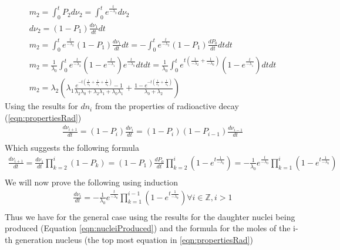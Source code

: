 \documentclass[12pt]{article}
\begin{document}
\begin{equation}\label{eqn:m2derivation}
\begin{split}
m_2 = \int_0^t P_2d\nu_{2} = \int_0^t e^{\frac{t}{-\lambda_2}}d\nu_2\\
d\nu_{2} = (1-P_{1})\frac{d\nu_{1}}{dt}dt\\
m_2 = \int_0^t e^{\frac{t}{-\lambda_2}}(1-P_{1})\frac{d\nu_{1}}{dt}dt = -\int_0^t e^{\frac{t}{-\lambda_2}}(1-P_{1})\frac{dP_0}{dt}dtdt\\
m_2 = \frac{1}{\lambda_0}\int_0^t e^{\frac{t}{-\lambda_2}}(1-e^{\frac{t}{-\lambda_1}})e^{\frac{t}{-\lambda_0}}dtdt = 
\frac{1}{\lambda_0}\int_0^t e^{t(\frac{1}{-\lambda_2}+\frac{1}{-\lambda_0})}(1-e^{\frac{t}{-\lambda_1}})dtdt\\
m_2 = \lambda_2(\lambda_1\frac{e^{-t(\frac{1}{\lambda_2}+\frac{1}{\lambda_1}+\frac{1}{\lambda_0})}-1}{\lambda_2\lambda_0+\lambda_2\lambda_1+\lambda_0\lambda_1}+\frac{1-e^{-t(\frac{1}{\lambda_2}+\frac{1}{\lambda_0})}}{\lambda_0+\lambda_2})
\end{split}
\end{equation}
Using the results for $dn_i$ from the properties of radioactive decay (\ref{eqn:propertiesRad})
\begin{equation}
\begin{split}
\frac{d\nu_{i+1}}{dt} = (1-P_{i})\frac{d\nu_{i}}{dt} =  (1-P_{i})(1-P_{i-1})\frac{d\nu_{i-1}}{dt}\\
\end{split}
\end{equation}
Which suggests the following formula 
\begin{equation}
\begin{split}
\frac{d\nu_{i+1}}{dt} = \frac{d\nu_{1}}{dt}\prod_{k=2}^{i} (1-P_{k}) = (1-P_{1})\frac{dP_0}{dt}\prod_{k=2}^{i} (1-e^{t\frac{1}{-\lambda_k}}) = -\frac{1}{\lambda_0}e^{\frac{t}{-\lambda_0}}\prod_{k=1}^{i} (1-e^{t\frac{1}{-\lambda_k}}) \\
\end{split}
\end{equation}
We will now prove the following using induction 
\begin{equation}\label{eqn:nucleiProduced}
\begin{split}
\frac{d\nu_{i}}{dt} = -\frac{1}{\lambda_0}e^{\frac{t}{-\lambda_0}}\prod_{k=1}^{i-1} (1-e^{t\frac{1}{-\lambda_k}})\forall i\in\mathbb{Z}, i>1\\
\end{split}
\end{equation}
Thus we have for the general case using the results for the daughter nuclei being produced (Equation \ref{eqn:nucleiProduced}) and the formula for the moles of the i-th generation nucleus (the top most equation in \ref{eqn:propertiesRad})
\end{document}
